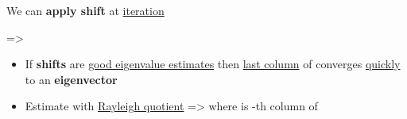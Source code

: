\hSep %

We can \textbf{apply shift}  at \underline{iteration} 

=> 
\begin{itemize}

      \item
            If \textbf{shifts} are \underline{good eigenvalue estimates} then \underline{last column} of
             converges \underline{quickly} to an \textbf{eigenvector}
      \item
            Estimate  with \underline{Rayleigh quotient} =>
            where  is -th column of

\end{itemize}